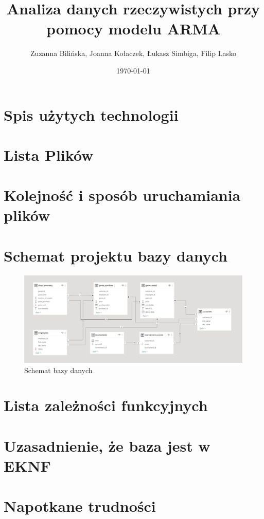 \documentclass{article}
\title{Analiza danych rzeczywistych przy pomocy modelu ARMA}
\author{Zuzanna Bilińska, Joanna Kołaczek, Łukasz Simbiga, Filip Lasko}
\date{\today}
\theoremstyle{break}
\begin{document}
	\maketitle
	\tableofcontents
	\clearpage

\section{Spis użytych technologii}

\section{Lista Plików}

\section{Kolejność i sposób uruchamiania plików}

\section{Schemat projektu bazy danych}
\begin{figure}[H]
	\begin{center}
		\includegraphics[scale=0.25]{schemat.png}
		\caption{Schemat bazy danych}
		\label{fig:schemat}
	\end{center}
\end{figure}

\section{Lista zależności funkcyjnych}

\section{Uzasadnienie, że baza jest w EKNF}

\section{Napotkane trudności}
	
\end{document}
